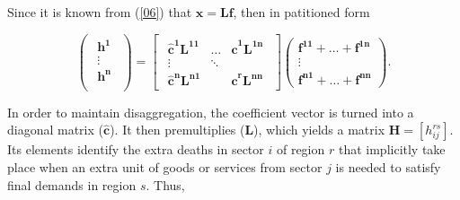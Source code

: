 \documentclass[a4paper,12pt]{article}
\begin{document}
\noindent Since it is known from (\ref{06}) that $\mathbf{x = Lf}$, then in patitioned form

\begin{equation} \begin{pmatrix} \begin{array}{c} \mathbf{h^1} \\ \vdots\\ \mathbf{h^n}\\ \end{array} \end{pmatrix} =
\begin{bmatrix} \begin{array}{ccc} \mathbf{\hat{c}^1 L^{11}} & \ldots & \mathbf{\hat{c}^1 L^{1n}} \\ \vdots &  \ddots &  \\ \mathbf{\hat{c}^n L^{n1}}
&  & \mathbf{\hat{c}^r L^{nn}} \end{array} \end{bmatrix} \left( \begin{array}{c} \mathbf{f^{11}} +  \ldots  +  \mathbf{f^{1n}} \\ \vdots 
\\ \mathbf{f^{n1}}  +  \ldots  +  \mathbf{f^{nn}} \end{array} \right). \label{09} 
\end{equation}

In order to maintain disaggregation, the coefficient vector is turned into a diagonal matrix ($\mathbf{\hat{c}}$). It then premultiplies ($\mathbf{L}$), which yields a matrix $\mathbf{H}=[h^{rs}_{ij}]$. Its elements identify the extra deaths in sector $i$ of region $r$ that implicitly take place when an extra unit of goods or services from sector $j$ is needed to satisfy final demands
in region $s$. Thus,
\end{document}
